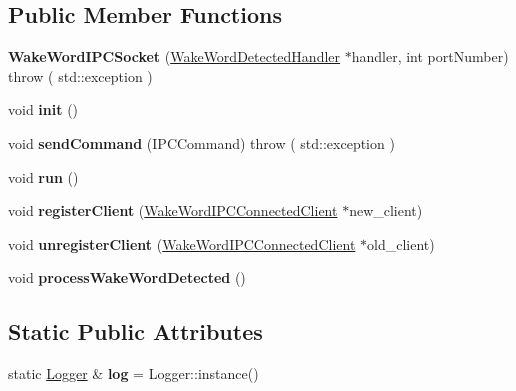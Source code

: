 \subsection*{Public Member Functions}
\begin{DoxyCompactItemize}
\item 
\mbox{\label{classWakeWord_1_1WakeWordIPCSocket_a92fe280290e8b39513659a7a7e09fe91}} 
{\bfseries Wake\+Word\+I\+P\+C\+Socket} (\hyperlink{classWakeWord_1_1WakeWordDetectedHandler}{Wake\+Word\+Detected\+Handler} $\ast$handler, int port\+Number)  throw ( std\+::exception )
\item 
\mbox{\label{classWakeWord_1_1WakeWordIPCSocket_afbbb6a3f366cd82d89c2c707033c61ca}} 
void {\bfseries init} ()
\item 
\mbox{\label{classWakeWord_1_1WakeWordIPCSocket_a2dccabdfee1391b187e2e684afd7f50a}} 
void {\bfseries send\+Command} (I\+P\+C\+Command)  throw ( std\+::exception )
\item 
\mbox{\label{classWakeWord_1_1WakeWordIPCSocket_a7f5da344af20a9fc26823e9c574a11bf}} 
void {\bfseries run} ()
\item 
\mbox{\label{classWakeWord_1_1WakeWordIPCSocket_ab783448eb6eb876fa3d1cc2a1d1ba04a}} 
void {\bfseries register\+Client} (\hyperlink{classWakeWord_1_1WakeWordIPCConnectedClient}{Wake\+Word\+I\+P\+C\+Connected\+Client} $\ast$new\+\_\+client)
\item 
\mbox{\label{classWakeWord_1_1WakeWordIPCSocket_aaf95161a4a1956a886af9cee9f872aee}} 
void {\bfseries unregister\+Client} (\hyperlink{classWakeWord_1_1WakeWordIPCConnectedClient}{Wake\+Word\+I\+P\+C\+Connected\+Client} $\ast$old\+\_\+client)
\item 
\mbox{\label{classWakeWord_1_1WakeWordIPCSocket_aa536d8b204fdfa6f2ffd38e8c23c2e77}} 
void {\bfseries process\+Wake\+Word\+Detected} ()
\end{DoxyCompactItemize}
\subsection*{Static Public Attributes}
\begin{DoxyCompactItemize}
\item 
\mbox{\label{classWakeWord_1_1WakeWordIPCSocket_a3fb9ddc9d8457219f09b923a9ed21f7b}} 
static \hyperlink{classLogger}{Logger} \& {\bfseries log} = Logger\+::instance()
\end{DoxyCompactItemize}
